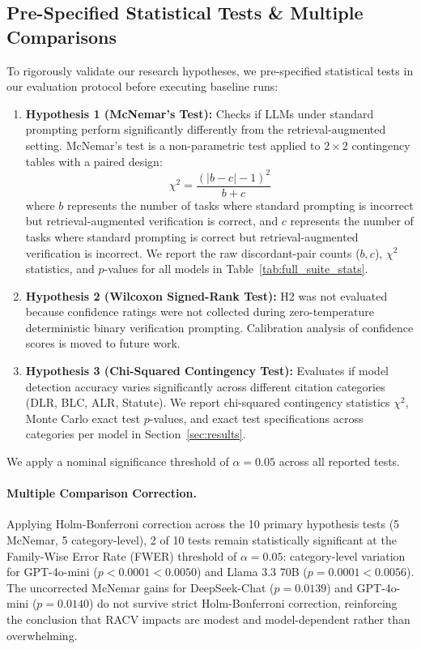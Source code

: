 \documentclass[conference]{IEEEtran}
\begin{document}
\subsection{Pre-Specified Statistical Tests \& Multiple Comparisons}
To rigorously validate our research hypotheses, we pre-specified statistical tests in our evaluation protocol before executing baseline runs:
\begin{enumerate}
\item \textbf{Hypothesis 1 (McNemar's Test):} Checks if LLMs under standard prompting perform significantly differently from the retrieval-augmented setting. McNemar's test is a non-parametric test applied to $2 \times 2$ contingency tables with a paired design:
   \begin{equation}
   \chi^2 = \frac{(|b - c| - 1)^2}{b + c}
   \end{equation}
   where $b$ represents the number of tasks where standard prompting is incorrect but retrieval-augmented verification is correct, and $c$ represents the number of tasks where standard prompting is correct but retrieval-augmented verification is incorrect. We report the raw discordant-pair counts ($b, c$), $\chi^2$ statistics, and $p$-values for all models in Table~\ref{tab:full_suite_stats}.
\item \textbf{Hypothesis 2 (Wilcoxon Signed-Rank Test):} H2 was not evaluated because confidence ratings were not collected during zero-temperature deterministic binary verification prompting. Calibration analysis of confidence scores is moved to future work.
\item \textbf{Hypothesis 3 (Chi-Squared Contingency Test):} Evaluates if model detection accuracy varies significantly across different citation categories (DLR, BLC, ALR, Statute). We report chi-squared contingency statistics $\chi^2$, Monte Carlo exact test $p$-values, and exact test specifications across categories per model in Section~\ref{sec:results}.
\end{enumerate}
We apply a nominal significance threshold of $\alpha = 0.05$ across all reported tests.

\paragraph{Multiple Comparison Correction.} Applying Holm-Bonferroni correction across the 10 primary hypothesis tests (5 McNemar, 5 category-level), 2 of 10 tests remain statistically significant at the Family-Wise Error Rate (FWER) threshold of $\alpha = 0.05$: category-level variation for GPT-4o-mini ($p < 0.0001 < 0.0050$) and Llama 3.3 70B ($p = 0.0001 < 0.0056$). The uncorrected McNemar gains for DeepSeek-Chat ($p=0.0139$) and GPT-4o-mini ($p=0.0140$) do not survive strict Holm-Bonferroni correction, reinforcing the conclusion that RACV impacts are modest and model-dependent rather than overwhelming.
\end{document}
